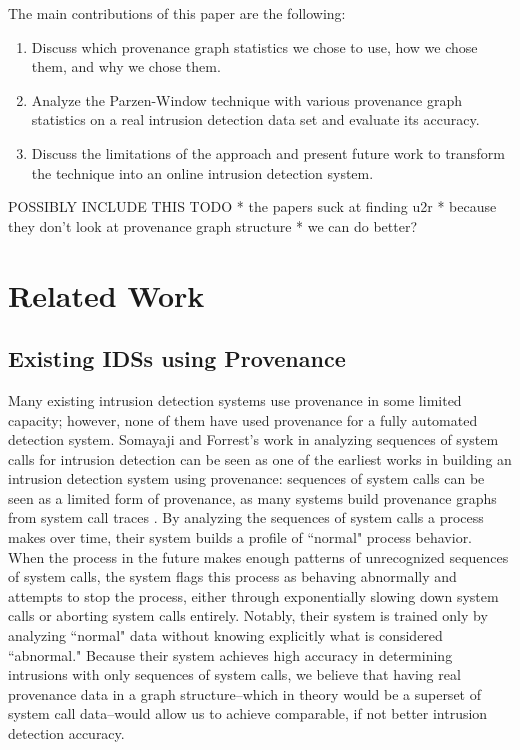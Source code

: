 \documentclass[10pt,twocolumn]{article}
\begin{document}
The main contributions of this paper are the following:
\begin{enumerate}
\item Discuss which provenance graph statistics we chose to use, how we chose them, and why we chose them.
\item Analyze the Parzen-Window technique with various provenance graph statistics on a real intrusion detection data set and evaluate its accuracy.
\item Discuss the limitations of the approach and present future work to transform the technique into an online intrusion detection system.
\end{enumerate}

POSSIBLY INCLUDE THIS TODO
* the papers suck at finding u2r
* because they don't look at provenance graph structure
* we can do better?


%

\section{Related Work}

\subsection{Existing IDSs using Provenance}

Many existing intrusion detection systems use provenance in some limited capacity; however, none of them
have used provenance for a fully automated detection system. 
Somayaji and Forrest's work in analyzing sequences of system calls for intrusion detection \cite{somayaji, somayaji-recent} can
be seen as one of the earliest works in building an intrusion detection system using provenance: sequences of
system calls can be seen as a limited form of provenance, as many systems build provenance graphs from
system call traces \cite{spade}. By analyzing the sequences
of system calls a process makes over time, their system builds a profile of ``normal" process behavior. When
the process in the future makes enough patterns of unrecognized sequences of system calls, the system flags
this process as behaving abnormally and attempts to stop the process, either through exponentially slowing down
system calls or aborting system calls entirely. Notably, their system is trained only by analyzing ``normal" data
without knowing explicitly what is considered ``abnormal." Because their system achieves high
accuracy in determining intrusions with only sequences of system calls, we believe that having real provenance
data in a graph structure--which in theory would be a superset of system call data--would allow us
to achieve comparable, if not better intrusion detection accuracy.
\end{document}
